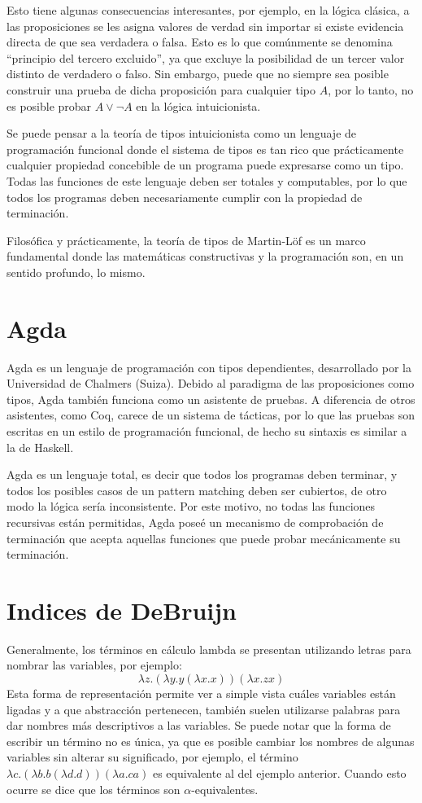 \documentclass[]{report}
\begin{document}
	Esto tiene algunas consecuencias interesantes, por ejemplo, en la lógica clásica, a las proposiciones se les asigna valores de verdad sin importar si existe evidencia directa de que sea verdadera o falsa.
	Esto es lo que comúnmente se denomina ``principio del tercero excluido'', ya que excluye la posibilidad de un tercer valor distinto de verdadero o falso.
	Sin embargo, puede que no siempre sea posible construir una prueba de dicha proposición para cualquier tipo $A$, por lo tanto, no es posible probar $A \vee \neg A$ en la lógica intuicionista.

	
	Se puede pensar a la teoría de tipos intuicionista como un lenguaje de programación funcional donde el sistema de tipos es tan rico que prácticamente cualquier propiedad concebible de un programa puede expresarse como un tipo.
	Todas las funciones de este lenguaje deben ser totales y computables, por lo que todos los programas deben necesariamente cumplir con la propiedad de terminación.
	
	Filosófica y prácticamente, la teoría de tipos de Martin-Löf es un marco fundamental donde las matemáticas constructivas y la programación son, en un sentido profundo, lo mismo.
	
	
	\section{Agda}
	Agda es un lenguaje de programación con tipos dependientes, desarrollado por la Universidad de
	Chalmers (Suiza).
	Debido al paradigma de las proposiciones como tipos, Agda también funciona como un asistente de pruebas.
	A diferencia de otros asistentes, como Coq, carece de un sistema de tácticas, por lo que las pruebas son escritas en un estilo de programación funcional, de hecho su sintaxis es similar a la de Haskell.

	Agda es un lenguaje total, es decir que todos los programas deben terminar, y todos los posibles casos de un pattern matching deben ser cubiertos, de otro modo la lógica sería inconsistente.
	Por este motivo, no todas las funciones recursivas están permitidas, Agda poseé un mecanismo de comprobación de terminación que acepta aquellas funciones que puede probar mecánicamente su terminación.
	
	
	\section{Indices de DeBruijn}
	Generalmente, los términos en cálculo lambda se presentan utilizando letras para nombrar las variables, por ejemplo:
	\[ \lambda z. (\lambda y. y (\lambda x. x)) (\lambda x. z x) \]
	Esta forma de representación permite ver a simple vista cuáles variables están ligadas y a que abstracción pertenecen, también suelen utilizarse palabras para dar nombres más descriptivos a las variables.
	Se puede notar que la forma de escribir un término no es única, ya que es posible cambiar los nombres de algunas variables sin alterar su significado, por ejemplo, el término $\lambda c. (\lambda b. b (\lambda d. d)) (\lambda a. c a)$ es equivalente al del ejemplo anterior.
	Cuando esto ocurre se dice que los términos son $\alpha$-equivalentes.
	
\end{document}
